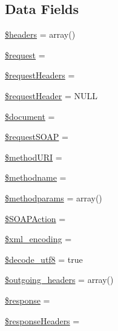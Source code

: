 \subsection*{Data Fields}
\begin{DoxyCompactItemize}
\item 
\hyperlink{classnusoap__server_a52500036ee807241b8b4b7e2367c49ef}{\$headers} = array()
\item 
\hyperlink{classnusoap__server_abb35c8495a232b510389fa6d7b15d38a}{\$request} = \textquotesingle{}\textquotesingle{}
\item 
\hyperlink{classnusoap__server_a245d2deb868c1cc1a23b10c48c6d0754}{\$request\+Headers} = \textquotesingle{}\textquotesingle{}
\item 
\hyperlink{classnusoap__server_a6ba1fc8d460c18c97ab0b2597197de22}{\$request\+Header} = N\+U\+L\+L
\item 
\hyperlink{classnusoap__server_ac5a31edb787609a3143dec9bfa8063ea}{\$document} = \textquotesingle{}\textquotesingle{}
\item 
\hyperlink{classnusoap__server_a76b7275a4c31f563c09042986d6e4c3b}{\$request\+S\+O\+A\+P} = \textquotesingle{}\textquotesingle{}
\item 
\hyperlink{classnusoap__server_a56655c621a045170b3ca350b663b84a6}{\$method\+U\+R\+I} = \textquotesingle{}\textquotesingle{}
\item 
\hyperlink{classnusoap__server_ae1579f9ce708fe6faf236f8015d6251b}{\$methodname} = \textquotesingle{}\textquotesingle{}
\item 
\hyperlink{classnusoap__server_a324e20e34ac140c80ed4709be5658b85}{\$methodparams} = array()
\item 
\hyperlink{classnusoap__server_a2c4c10ecb8af347cc9e9e137e8bacab7}{\$\+S\+O\+A\+P\+Action} = \textquotesingle{}\textquotesingle{}
\item 
\hyperlink{classnusoap__server_a1e2ee3fea6dbb8374da999a9df7d024d}{\$xml\+\_\+encoding} = \textquotesingle{}\textquotesingle{}
\item 
\hyperlink{classnusoap__server_a15fe586a802bc22337e3fe874d6da038}{\$decode\+\_\+utf8} = true
\item 
\hyperlink{classnusoap__server_ac4175695783164be56dd48fda2e405b2}{\$outgoing\+\_\+headers} = array()
\item 
\hyperlink{classnusoap__server_af4b6fb1bbc77ccc05f10da3b16935b99}{\$response} = \textquotesingle{}\textquotesingle{}
\item 
\hyperlink{classnusoap__server_a02f80cf3a7fe7cf42c97b821c167b934}{\$response\+Headers} = \textquotesingle{}\textquotesingle{}

\end{DoxyCompactItemize}
